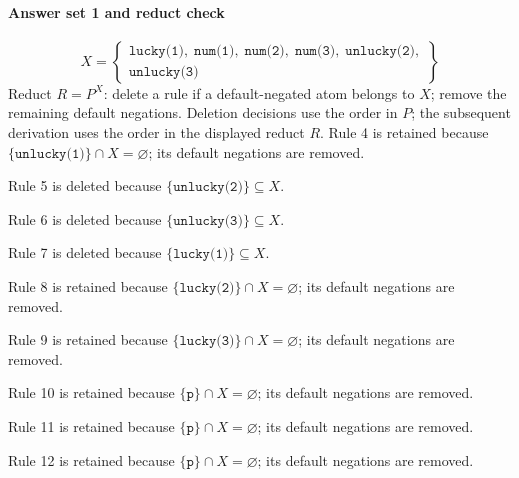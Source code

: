 \documentclass[a4paper,11pt]{article}
\newcommand{\at}[1]{\texttt{#1}}
\begin{document}
\paragraph{Answer set 1 and reduct check}
\[
X=\left\{\begin{gathered}\at{lucky(1)},\;\at{num(1)},\;\at{num(2)},\;\at{num(3)},\;\at{unlucky(2)},\\\at{unlucky(3)}\end{gathered}\right\}
\]
Reduct $R=P^X$: delete a rule if a default-negated atom belongs to $X$; remove the remaining default negations. Deletion decisions use the order in $P$; the subsequent derivation uses the order in the displayed reduct $R$.
Rule 4 is retained because $\{\at{unlucky(1)}\}\cap X=\varnothing$; its default negations are removed.

Rule 5 is deleted because $\{\at{unlucky(2)}\}\subseteq X$.

Rule 6 is deleted because $\{\at{unlucky(3)}\}\subseteq X$.

Rule 7 is deleted because $\{\at{lucky(1)}\}\subseteq X$.

Rule 8 is retained because $\{\at{lucky(2)}\}\cap X=\varnothing$; its default negations are removed.

Rule 9 is retained because $\{\at{lucky(3)}\}\cap X=\varnothing$; its default negations are removed.

Rule 10 is retained because $\{\at{p}\}\cap X=\varnothing$; its default negations are removed.

Rule 11 is retained because $\{\at{p}\}\cap X=\varnothing$; its default negations are removed.

Rule 12 is retained because $\{\at{p}\}\cap X=\varnothing$; its default negations are removed.
\end{document}
